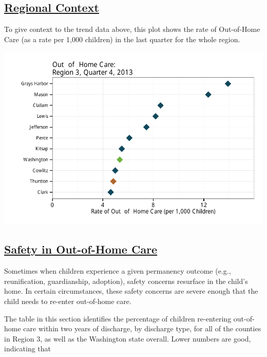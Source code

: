 \documentclass{article}\usepackage{graphicx, color}
\makeatletter
\def\maxwidth{ %
  \ifdim\Gin@nat@width>\linewidth
    \linewidth
  \else
    \Gin@nat@width
  \fi
}
\newenvironment{knitrout}{}{} %
\makeatother
\begin{document}
\subsection{\href{http://www.partnersforourchildren.org/child-well-being/visualizations/out-home-care/trends}
    {Regional Context}
}
To give context to the trend data above, this plot shows the rate of Out-of-Home Care (as a rate per 1,000 children) in the last quarter for the whole region.

\begin{knitrout}
\color{fgcolor}

{\centering \includegraphics[width=\maxwidth]{figure/ooh_context} 

}



\end{knitrout}


\subsection{\href{http://www.partnersforourchildren.org/child-well-being/visualizations/out-home-care/safety}
    {Safety in Out-of-Home Care}
}

Sometimes when children experience a given permanency outcome (e.g., reunification, guardianship, adoption), safety concerns resurface in the child's home. In certain circumstances, these safety concerns are severe enough that the child needs to re-enter out-of-home care.

The table in this section identifies the percentage of children re-entering out-of-home care within two years of discharge, by discharge type, for all of the counties in Region 3, as well as the Washington state overall. Lower numbers are good, indicating that 
\end{document}
